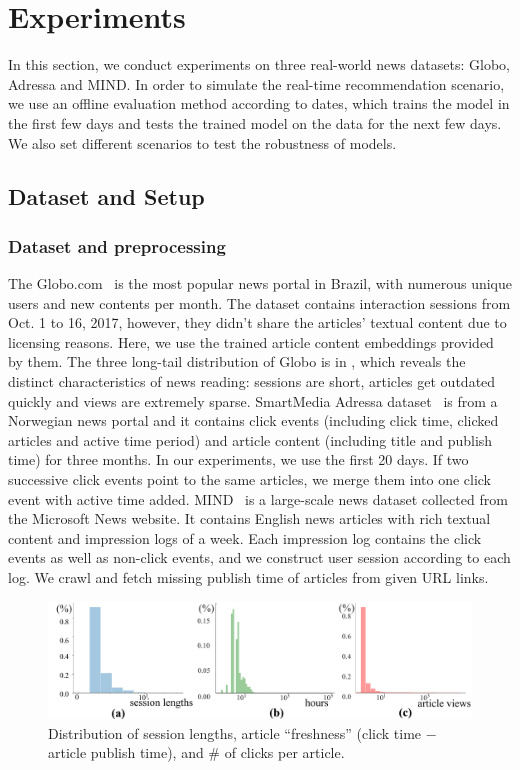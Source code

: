 \section{Experiments}
\label{sec:experiment}
In this section, we conduct experiments on three real-world news datasets: 
Globo, Adressa and MIND. In order to simulate the real-time recommendation 
scenario, we use an offline evaluation method according to dates,  
which trains the model in the first few days and tests the trained model 
on the data for the next few days. We also set different scenarios 
to test the robustness of models. 

\subsection{Dataset and Setup}
\subsubsection{Dataset and preprocessing}
The Globo.com~\cite{moreira_news_2018} is the most popular news portal in Brazil, with numerous unique users and new contents per month. The dataset contains interaction sessions from Oct. 1 to 16, 2017, however, they didn't share the articles' textual content due to licensing reasons. Here, we use the trained article content embeddings provided by them. The three long-tail distribution of Globo is in , 
which reveals the distinct characteristics of news reading: sessions are short, 
articles get outdated quickly and views are extremely sparse.
SmartMedia Adressa dataset~\cite{gulla_adressa_2017} is from a Norwegian news portal 
and it contains click events (including click time, 
clicked articles and active time period) 
and article content (including title and publish time) for three months. 
In our experiments, we use the first 20 days. If two successive click events point 
to the same articles, we merge them into one click event with active time added.
MIND~\cite{wu2020mind} is a large-scale news dataset collected from the Microsoft News website. It contains English news articles with rich textual content and impression logs of a week. Each impression log contains the click events as well as non-click events, and we construct user session according to each log. We crawl and fetch missing publish time of articles from given URL links.

\begin{figure}[th]
  \centering
  \includegraphics[width=\columnwidth]{fig/data_distribution.pdf}
  \caption{Distribution of session lengths, article ``freshness'' 
(click time $-$ article publish time), and \# of clicks per article.}
  \label{fig:data_distribution}
\end{figure}

